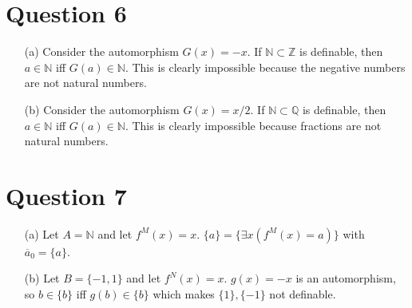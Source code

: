 \documentclass[10pt]{article}
\begin{document}
\section*{Question 6}
\begin{itemize}
    \item [(a)] Consider the automorphism $G(x)=-x$. If $\mathbb{N}\subset \mathbb{Z}$ is definable, then $a\in \mathbb{N}$ iff $G(a)\in\mathbb{N}$. 
    This is clearly impossible because the negative numbers are not natural numbers.
    \item [(b)] Consider the automorphism $G(x)=x/2$. If $\mathbb{N}\subset \mathbb{Q}$ is definable, then $a\in \mathbb{N}$ iff $G(a)\in\mathbb{N}$. 
    This is clearly impossible because fractions are not natural numbers.
\end{itemize}
\section*{Question 7}
\begin{itemize}
    \item [(a)] Let $A=\mathbb{N}$ and let $f^M(x)=x$. $\{a\}=\{\exists x(f^M(x)=a)\}$ with $\overline{a}_0=\{a\}$.
    \item [(b)] Let $B=\{-1,1\}$ and let $f^N(x)=x$. 
    $g(x)=-x$ is an automorphism, so $b\in\{b\}$ iff $g(b)\in\{b\}$ which makes $\{1\},\{-1\}$ not definable. 
\end{itemize}
\end{document}
